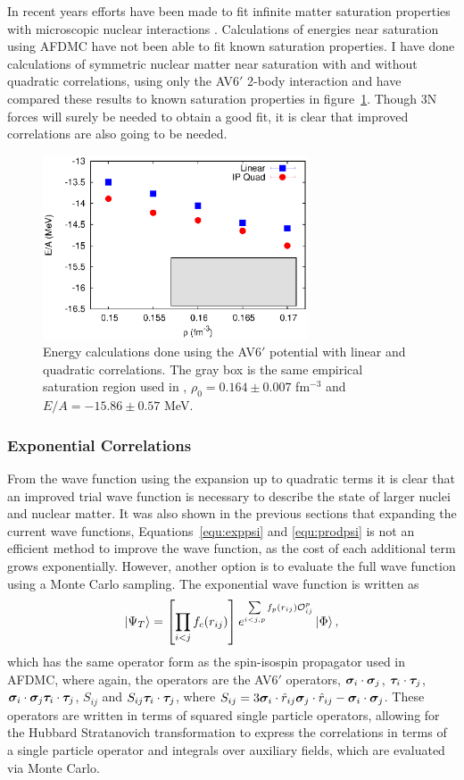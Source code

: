 In recent years efforts have been made to fit infinite matter saturation properties with microscopic nuclear interactions \cite{drischler2017}. Calculations of energies near saturation using AFDMC have not been able to fit known saturation properties. I have done calculations of symmetric nuclear matter near saturation with and without quadratic correlations, using only the AV6$'$ 2-body interaction and have compared these results to known saturation properties in figure~\ref{fig:saturation}. Though 3N forces will surely be needed to obtain a good fit, it is clear that improved correlations are also going to be needed.
\begin{figure}[h!]
   \centering
   \includegraphics[width=0.7\textwidth]{figures/saturation.eps}
   \caption{Energy calculations done using the AV6$'$ potential with linear and quadratic correlations. The gray box is the same empirical saturation region used in \cite{drischler2017}, $\rho_0 = 0.164 \pm 0.007$ fm$^{-3}$ and $E/A=-15.86 \pm 0.57$ MeV.}
   \label{fig:saturation}
\end{figure}

\subsubsection{Exponential Correlations}
From the wave function using the expansion up to quadratic terms it is clear that an improved trial wave function is necessary to describe the state of larger nuclei and nuclear matter. It was also shown in the previous sections that expanding the current wave functions, Equations~\ref{equ:exppsi} and \ref{equ:prodpsi} is not an efficient method to improve the wave function, as the cost of each additional term grows exponentially. However, another option is to evaluate the full wave function using a Monte Carlo sampling. The exponential wave function is written as
\begin{equation}
   \left| \Psi_T \right> = \left[\prod\limits_{i<j}f_c(r_{ij})\right] e^{\sum\limits_{i<j,p}f_p(r_{ij})\mathcal{O}^p_{ij}} \left| \Phi \right>,
\end{equation}
which has the same operator form as the spin-isospin propagator used in AFDMC, where again, the operators are the AV6$'$ operators, $\bm{\sigma}_i\cdot\bm{\sigma}_j$, $\bm{\tau}_i\cdot\bm{\tau}_j$, $\bm{\sigma}_i\cdot\bm{\sigma}_j \bm{\tau}_i\cdot\bm{\tau}_j$, $S_{ij}$ and $S_{ij} \bm{\tau}_i\cdot\bm{\tau}_j$, where $S_{ij} = 3\bm{\sigma}_i\cdot\hat{r}_{ij}\bm{\sigma}_j\cdot\hat{r}_{ij}-\bm{\sigma}_i\cdot\bm{\sigma}_j$. These operators are written in terms of squared single particle operators, allowing for the Hubbard Stratanovich transformation to express the correlations in terms of a single particle operator and integrals over auxiliary fields, which are evaluated via Monte Carlo.

